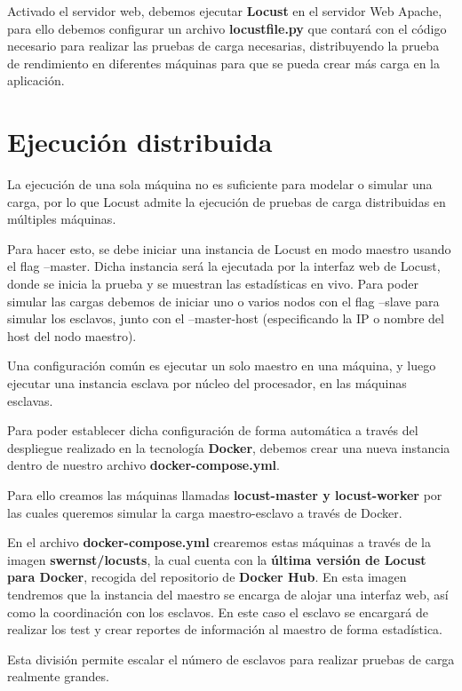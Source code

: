 Activado el servidor web, debemos ejecutar \textbf{Locust} en el servidor Web Apache, para ello debemos configurar un archivo \textbf{locustfile.py} que contará con el código necesario para realizar las pruebas de carga necesarias, distribuyendo la prueba de rendimiento en diferentes máquinas para que se pueda crear más carga en la aplicación.\cite{locustfile}

\section{Ejecución distribuida}

La ejecución de una sola máquina no es suficiente para modelar o simular una carga, por lo que Locust admite la ejecución de pruebas de carga distribuidas en múltiples máquinas.

Para hacer esto, se debe iniciar una instancia de Locust en modo maestro usando el flag --master. Dicha instancia será la ejecutada por la interfaz web de Locust, donde se inicia la prueba y se muestran las estadísticas en vivo.
\newpage
Para poder simular las cargas debemos de iniciar uno o varios nodos con el flag --slave para simular los esclavos, junto con el --master-host (especificando la IP o nombre del host del nodo maestro).

Una configuración común es ejecutar un solo maestro en una máquina, y luego ejecutar una instancia esclava por núcleo del procesador, en las máquinas esclavas.

Para poder establecer dicha configuración de forma automática a través del despliegue realizado en la tecnología \textbf{Docker}, debemos crear una nueva instancia dentro de nuestro archivo \textbf{docker-compose.yml}.

Para ello creamos las máquinas llamadas \textbf{locust-master y locust-worker} por las cuales queremos simular la carga maestro-esclavo a través de Docker.

En el archivo \textbf{docker-compose.yml} crearemos estas máquinas a través de la imagen \textbf{swernst/locusts}, la cual cuenta con la \textbf{última versión de Locust para Docker}, recogida del repositorio de \textbf{Docker Hub}. En esta imagen tendremos que la instancia del maestro se encarga de alojar una interfaz web, así como la coordinación con los esclavos. En este caso el esclavo se encargará de realizar los test y crear reportes de información al maestro de forma estadística.

Esta división permite escalar el número de esclavos para realizar pruebas de carga realmente grandes.

